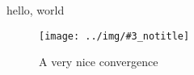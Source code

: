 \documentclass{article}
\newlength\figureheight
\newlength\figurewidth
\newcommand{\InputImage}[3]{}
\renewcommand{\InputImage}[3]{%
		\setlength\figureheight{#2}%
		\setlength\figurewidth{#1}%
	}%
\renewcommand{\InputImage}[3]{%
		\texttt{[image: ../img/\#3\_notitle]}%
	}%
\begin{document}
hello, world
\begin{figure}

  \InputImage{0.7\textwidth}{0.6\textwidth}{single_sample_convergence_fractionalbrownianmotionh05t02_rho}
    \caption{A very nice convergence}
\end{figure}
\end{document}
